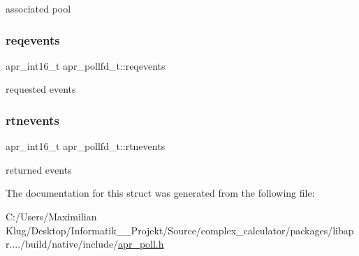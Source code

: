 associated pool \mbox{\label{structapr__pollfd__t_abcedac7097a97823a38ece6e47f4ea9f}} 
\subsubsection{\texorpdfstring{reqevents}{reqevents}}
{\footnotesize\ttfamily apr\+\_\+int16\+\_\+t apr\+\_\+pollfd\+\_\+t\+::reqevents}

requested events \mbox{\label{structapr__pollfd__t_aed5b2109b27984975309922bfa84e3f6}} 
\subsubsection{\texorpdfstring{rtnevents}{rtnevents}}
{\footnotesize\ttfamily apr\+\_\+int16\+\_\+t apr\+\_\+pollfd\+\_\+t\+::rtnevents}

returned events 

The documentation for this struct was generated from the following file\+:\begin{DoxyCompactItemize}
\item 
C\+:/\+Users/\+Maximilian Klug/\+Desktop/\+Informatik\+\_\+\_\+\+Projekt/\+Source/complex\+\_\+calculator/packages/libapr..../build/native/include/\mbox{\hyperlink{apr__poll_8h}{apr\+\_\+poll.\+h}}\end{DoxyCompactItemize}
